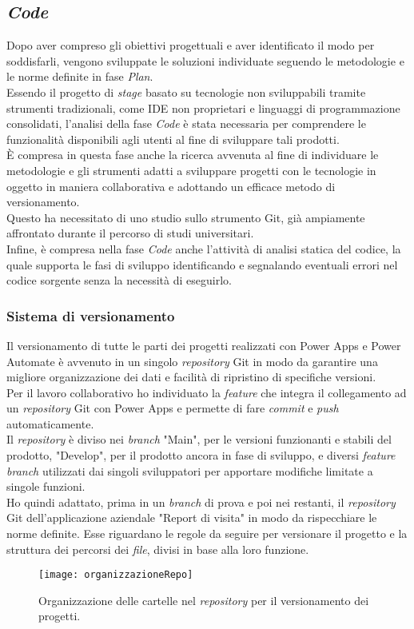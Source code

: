 \subsection{\emph{Code}}
Dopo aver compreso gli obiettivi progettuali e aver identificato il modo per soddisfarli, vengono sviluppate le soluzioni individuate seguendo le metodologie e le norme definite in fase \emph{Plan}.\\
Essendo il progetto di \emph{stage} basato su tecnologie non sviluppabili tramite strumenti tradizionali, come IDE non proprietari e linguaggi di programmazione consolidati, l'analisi della fase \emph{Code} è stata necessaria per comprendere le funzionalità disponibili agli utenti al fine di sviluppare tali prodotti.\\
È compresa in questa fase anche la ricerca avvenuta al fine di individuare le metodologie e gli strumenti adatti a sviluppare progetti con le tecnologie in oggetto in maniera collaborativa e adottando un efficace metodo di versionamento.\\
Questo ha necessitato di uno studio sullo strumento Git, già ampiamente affrontato durante il percorso di studi universitari.\\
Infine, è compresa nella fase \emph{Code} anche l'attività di analisi statica del codice, la quale supporta le fasi di sviluppo identificando e segnalando eventuali errori nel codice sorgente senza la necessità di eseguirlo.

\subsubsection*{Sistema di versionamento}
Il versionamento di tutte le parti dei progetti realizzati con Power Apps e Power Automate è avvenuto in un singolo \emph{repository} Git in modo da garantire una migliore organizzazione dei dati e facilità di ripristino di specifiche versioni.\\
Per il lavoro collaborativo ho individuato la \emph{feature} che integra il collegamento ad un \emph{repository} Git con Power Apps e permette di fare \emph{commit} e \emph{push} automaticamente.\\
Il \emph{repository} è diviso nei \emph{branch} "Main", per le versioni funzionanti e stabili del prodotto, "Develop", per il prodotto ancora in fase di sviluppo, e diversi \emph{feature branch} utilizzati dai singoli sviluppatori per apportare modifiche limitate a singole funzioni.\\
Ho quindi adattato, prima in un \emph{branch} di prova e poi nei restanti, il \emph{repository} Git dell'applicazione aziendale "Report di visita" in modo da rispecchiare le norme definite.
Esse riguardano le regole da seguire per versionare il progetto e la struttura dei percorsi dei \emph{file}, divisi in base alla loro funzione.
\begin{figure}[htbp] 
    \centering 
    \texttt{[image: organizzazioneRepo]} 
    \caption{Organizzazione delle cartelle nel \emph{repository} per il versionamento dei progetti.}
    \label{fig:organizzazioneRepo}
\end{figure}

